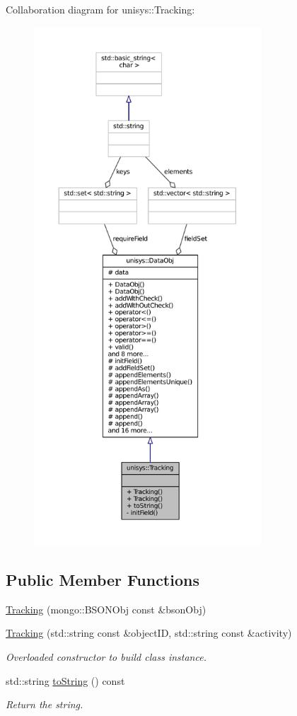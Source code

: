 Collaboration diagram for unisys\-:\-:Tracking\-:
\nopagebreak
\begin{figure}[H]
\begin{center}
\leavevmode
\includegraphics[height=550pt]{classunisys_1_1Tracking__coll__graph}
\end{center}
\end{figure}
\subsection*{Public Member Functions}
\begin{DoxyCompactItemize}
\item 
\hyperlink{classunisys_1_1Tracking_a1a75885a5535cffe27ff891f836e8fdd}{Tracking} (mongo\-::\-B\-S\-O\-N\-Obj const \&bson\-Obj)
\item 
\hyperlink{classunisys_1_1Tracking_aa189c069eca6579f5e25396df9644e43}{Tracking} (std\-::string const \&object\-I\-D, std\-::string const \&activity)
\begin{DoxyCompactList}\small\item\em Overloaded constructor to build class instance. \end{DoxyCompactList}\item 
std\-::string \hyperlink{classunisys_1_1Tracking_abc1a887f92c931657e1f68cf0ab74821}{to\-String} () const 
\begin{DoxyCompactList}\small\item\em Return the string. \end{DoxyCompactList}\end{DoxyCompactItemize}
